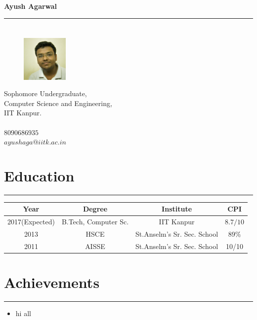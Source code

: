 \documentclass[a4paper]{article}
\author{Ayush Agarwal}
\begin{document}
\begin{center}
 \huge\textbf{Ayush Agarwal}\\
\end{center}
\hrule
\section*{}
\begin{figure} 
    \includegraphics[width=0.20\textwidth]{photo}
\end{figure}
 Sophomore Undergraduate,\\
 Computer Science and Engineering,\\
 IIT Kanpur.\\
 \\
 $8090686935$\\
 $ayushaga@iitk.ac.in$\\
 \vspace{10mm}
 \section*{Education}
 \hrule
 \begin{center}
 \vspace{3mm}
  \begin{tabular}{|c|c|c|c|}
  \hline
  Year & Degree & Institute & CPI\\
  \hline
  2017(Expected)& B.Tech, Computer Sc.&IIT Kanpur&$8.7/10$\\
  \hline
  2013& HSCE&St.Anselm's Sr. Sec. School&89\% \\
  \hline
  2011& AISSE&St.Anselm's Sr. Sec. School&10/10 \\
  \hline
  \end{tabular}

 \end{center}
 \section*{Achievements}
 \hrule
 \vspace{3mm}
  \begin{itemize}
   \item hi all
  \end{itemize}
\end{document}
